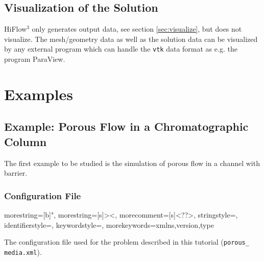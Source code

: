 \documentclass{article}
\begin{document}
\subsection{Visualization of the Solution}

HiFlow$^\text{3}$ only generates output data, see section \ref{sec:visualize}, but does not visualize. The mesh/geometry
data as well as the solution data can be visualized by any external program which can handle the
\texttt{vtk} data format as e.g. the program ParaView\cite{ParaView}.


\pagebreak
\section{Examples}

\subsection{Example: Porous Flow in a Chromatographic Column}

The first example to be studied is the simulation of porous flow in a channel with barrier.

\subsubsection{Configuration File}



{
  morestring=[b]",
  morestring=[s]{>}{<},
  morecomment=[s]{<?}{?>},
  stringstyle=\color{black},
  identifierstyle=\color{cyan},
  keywordstyle=\color{darkblue},
  morekeywords={xmlns,version,type}%
}

\lstset{
  language=XML
}
The configuration file used for the problem described in this tutorial (\texttt{porous\_ media.xml}).
\end{document}
